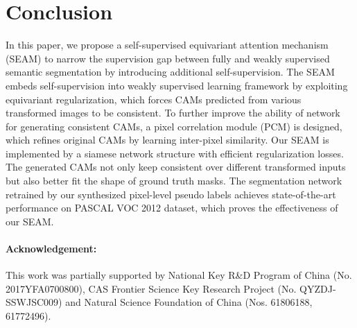 \documentclass[10pt,twocolumn,letterpaper]{article}
\begin{document}
	\section{Conclusion}
	In this paper, we propose a self-supervised equivariant attention mechanism (SEAM) to narrow the supervision gap between fully and weakly supervised semantic segmentation by introducing additional self-supervision. The SEAM embeds self-supervision into weakly supervised learning framework by exploiting equivariant regularization, which forces CAMs predicted from various transformed images to be consistent. To further improve the ability of network for generating consistent CAMs, a pixel correlation module (PCM) is designed, which refines original CAMs by learning inter-pixel similarity. Our SEAM is implemented by a siamese network structure with efficient regularization losses. The generated CAMs not only keep consistent over different transformed inputs but also better fit the shape of ground truth masks. The segmentation network retrained by our synthesized pixel-level pseudo labels achieves state-of-the-art performance on PASCAL VOC 2012 dataset, which proves the effectiveness of our SEAM.

	\paragraph{Acknowledgement:}
	This work was partially supported by National Key R\&D Program of China (No. 2017YFA0700800), CAS\; Frontier\; Science\; Key\; Research\; Project\; (No.\; QYZDJ-SSWJSC009) and Natural Science Foundation of China (Nos. 61806188, 61772496).
	
	{\small
		
		
	}
	
\end{document}
